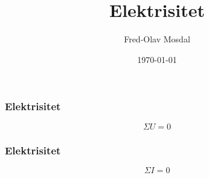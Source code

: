 \documentclass[aspectratio=169,xcolor=dvipsnames]{beamer}
\title[Elektrisitet]{Elektrisitet} %
\author[Fred-Olav] {Fred-Olav Mosdal}
\institute[Gand VGS] %
{
    Gand VGS \\
    VG1 TIF }
\date{\today} %
\begin{document}
\begin{frame}
	\Huge
	\frametitle{Elektrisitet}
	$$\Sigma U=0$$
\end{frame}
\begin{frame}
	\Huge
	\frametitle{Elektrisitet}
	$$\Sigma I=0$$
\end{frame}
\end{document}
